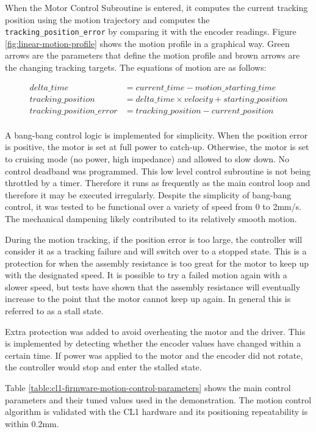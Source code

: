When the Motor Control Subroutine is entered, it computes the current tracking position using the motion trajectory and computes the {\tt tracking\_position\_error} by comparing it with the encoder readings.
Figure \ref{fig:linear-motion-profile} shows the motion profile in a graphical way. Green arrows are the parameters that define the motion profile and brown arrows are the changing tracking targets.
The equations of motion are as follows:

\begin{align*}
    delta\_time &= current\_time - motion\_starting\_time \nonumber \\
tracking\_position &= delta\_time \times velocity +  starting\_position \nonumber \\
tracking\_position\_error &= tracking\_position - current\_position \nonumber \\
\end{align*}

A bang-bang control logic is implemented for simplicity. When the position error is positive, the motor is set at full power to catch-up. Otherwise, the motor is set to cruising mode (no power, high impedance) and allowed to slow down. No control deadband was programmed. This low level control subroutine is not being throttled by a timer. Therefore it runs as frequently as the main control loop and therefore it may be executed irregularly. Despite the simplicity of bang-bang control, it was tested to be functional over a variety of speed from 0 to 2mm/s. The mechanical dampening likely contributed to its relatively smooth motion.

During the motion tracking, if the position error is too large, the controller will consider it as a tracking failure and will switch over to a stopped state. This is a protection for when the assembly resistance is too great for the motor to keep up with the designated speed. It is possible to try a failed motion again with a slower speed, but tests have shown that the assembly resistance will eventually increase to the point that the motor cannot keep up again. In general this is referred to as a stall state.

Extra protection was added to avoid overheating the motor and the driver. This is implemented by detecting whether the encoder values have changed within a certain time. If power was applied to the motor and the encoder did not rotate, the controller would stop and enter the stalled state.

Table \ref{table:cl1-firmware-motion-control-parameters} shows the main control parameters and their tuned values used in the demonstration. The motion control algorithm is validated with the CL1 hardware and its positioning repeatability is within 0.2mm.

